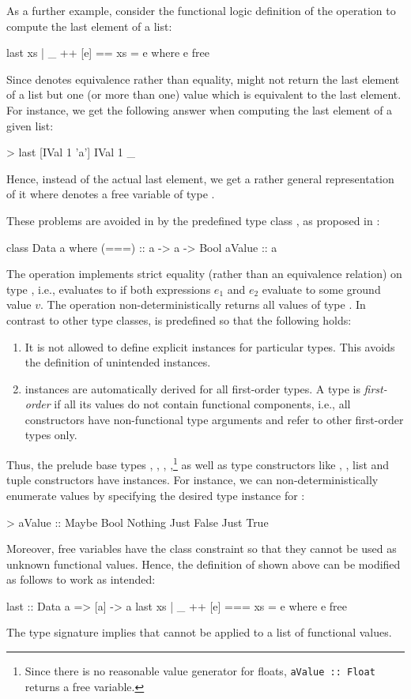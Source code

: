 As a further example, consider the functional logic definition
of the operation  to compute the last element of a list:
%
\begin{curry}
last xs | _ ++ [e] == xs = e
  where e free
\end{curry}
%
Since \ccode{==} denotes equivalence rather than equality,
 might not return the last element of a list
but one (or more than one) value which is equivalent to the
last element.
For instance, we get the following answer when computing the last element
of a given  list:
%
\begin{curry}
> last [IVal 1 'a']
IVal 1 _
\end{curry}
%
Hence, instead of the actual last element, we get a rather general
representation of it where \ccode{\us} denotes a free variable
of type .

These problems are avoided in \CYS by the predefined type class ,
as proposed in \cite{HanusTeegen20}:
%
\begin{curry}
class Data a where
  (===)  :: a -> a -> Bool
  aValue :: a
\end{curry}
%
The operation \ccode{===} implements strict equality
(rather than an equivalence relation) on type ,
i.e.,  evaluates to 
if both expressions $e_1$ and $e_2$ evaluate to some ground value $v$.
The operation  non-deterministically returns
all values of type .
In contrast to other type classes,  is predefined
so that the following holds:
%
\begin{enumerate}
\item
It is not allowed to define explicit  instances
for particular types. This avoids the definition of unintended instances.
\item
{} instances are automatically derived
for all first-order types.
A type is \emph{first-order} if all its values
do not contain functional components,
i.e., all constructors have non-functional type arguments and
refer to other first-order types only.
\end{enumerate}
%
Thus, the prelude base types , , ,
,\footnote{Since there is no reasonable value generator
for floats, \texttt{aValue~::~Float} returns a free variable.}
 as well as type constructors like
, , list and tuple constructors
have  instances.
For instance, we can non-deterministically enumerate values
by specifying the desired type instance for :
%
\begin{curry}
> aValue :: Maybe Bool
Nothing
Just False
Just True
\end{curry}
%
Moreover, free variables have the class constraint 
so that they cannot be used as unknown functional values.
Hence, the definition of  shown above
can be modified as follows to work as intended:
%
\begin{curry}
last :: Data a => [a] -> a
last xs | _ ++ [e] === xs = e
  where e free
\end{curry}
%
The type signature implies that  cannot be applied
to a list of functional values.

